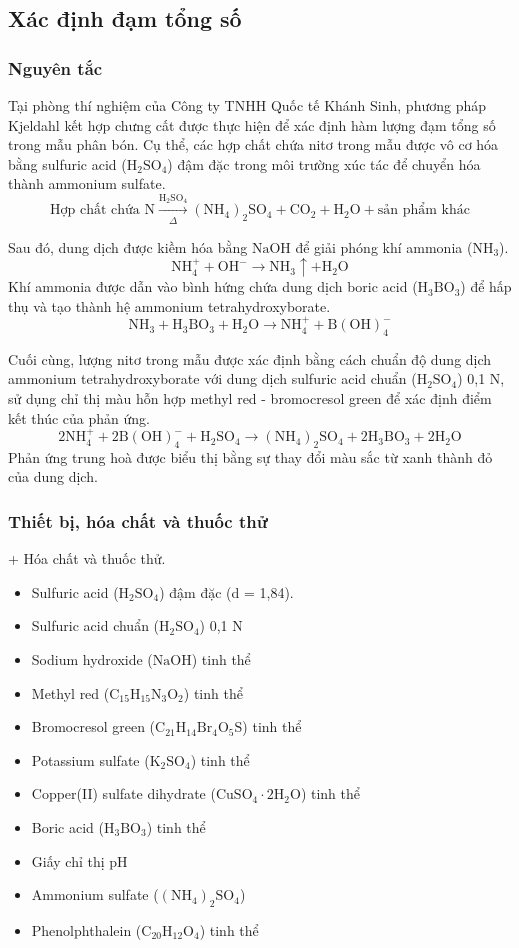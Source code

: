 \subsection{Xác định đạm tổng số}
\subsubsection{Nguyên tắc}
Tại phòng thí nghiệm của Công ty TNHH Quốc tế Khánh Sinh, phương pháp Kjeldahl kết hợp chưng cất được thực hiện để xác định hàm lượng đạm tổng số trong mẫu phân bón.
Cụ thể, các hợp chất chứa nitơ trong mẫu được vô cơ hóa bằng sulfuric acid (\(\mathrm{H_2SO_4}\)) đậm đặc trong môi trường xúc tác để chuyển hóa thành ammonium sulfate.
\[
  \text{Hợp chất chứa N}
  \xrightarrow[\Delta]{\mathrm{H_2SO_4}}
  \mathrm{(NH_4)_2SO_4 + CO_2 + H_2O + \text{sản phẩm khác}}
\]

Sau đó, dung dịch được kiềm hóa bằng \(\mathrm{NaOH}\) để giải phóng khí ammonia (\(\mathrm{NH_3}\)).
\[
  \mathrm{NH_4^+ + OH^- \longrightarrow NH_3 \uparrow + H_2O}
\]
Khí ammonia được dẫn vào bình hứng chứa dung dịch boric acid (\(\mathrm{H_3BO_3}\)) để hấp thụ và tạo thành hệ ammonium tetrahydroxyborate.
\[
  \mathrm{NH_3 + H_3BO_3 + H_2O \longrightarrow NH_4^+ + B(OH)_4^-}
\]

Cuối cùng, lượng nitơ trong mẫu được xác định bằng cách chuẩn độ dung dịch ammonium tetrahydroxyborate với dung dịch sulfuric acid chuẩn (\(\mathrm{H_2SO_4}\)) 0,1 N, sử dụng chỉ thị màu hỗn hợp methyl red - bromocresol green để xác định điểm kết thúc của phản ứng.
\[
  \mathrm{2NH_4^+ + 2B(OH)_4^- + H_2SO_4 \longrightarrow (NH_4)_2SO_4 + 2H_3BO_3 + 2H_2O}
\]
Phản ứng trung hoà được biểu thị bằng sự thay đổi màu sắc từ xanh thành đỏ của dung dịch.

\subsubsection{Thiết bị, hóa chất và thuốc thử}
+ Hóa chất và thuốc thử.
\begin{itemize}
  \item Sulfuric acid (\(\mathrm{H_2SO_4}\)) đậm đặc (d = 1,84).
  \item Sulfuric acid chuẩn (\(\mathrm{H_2SO_4}\)) 0,1 N
  \item Sodium hydroxide (\(\mathrm{NaOH}\)) tinh thể
  \item Methyl red (\(\mathrm{C_{15}H_{15}N_3O_2}\)) tinh thể
  \item Bromocresol green (\(\mathrm{C_{21}H_{14}Br_4O_5S}\)) tinh thể
  \item Potassium sulfate (\(\mathrm{K_2SO_4}\)) tinh thể
  \item Copper(II) sulfate dihydrate (\(\mathrm{CuSO_4\cdot 2H_2O}\)) tinh thể
  \item Boric acid (\(\mathrm{H_3BO_3}\)) tinh thể
  \item Giấy chỉ thị pH
  \item Ammonium sulfate (\(\mathrm{(NH_4)_2SO_4}\))
  \item Phenolphthalein (\(\mathrm{C_{20}H_{12}O_4}\)) tinh thể
\end{itemize}

